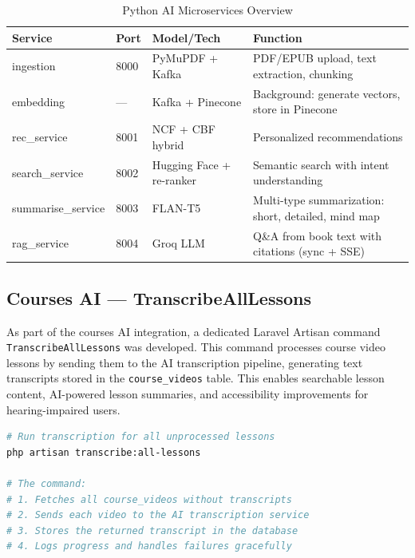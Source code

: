 \begin{table}[H]
\centering
\caption{Python AI Microservices Overview}
\begin{tabularx}{\textwidth}{|l|l|l|X|}
\hline
\textbf{Service} & \textbf{Port} & \textbf{Model/Tech} & \textbf{Function} \\
\hline
ingestion        & 8000 & PyMuPDF + Kafka          & PDF/EPUB upload, text extraction, chunking \\
\hline
embedding        & ---  & Kafka + Pinecone         & Background: generate vectors, store in Pinecone \\
\hline
rec\_service     & 8001 & NCF + CBF hybrid         & Personalized recommendations \\
\hline
search\_service  & 8002 & Hugging Face + re-ranker & Semantic search with intent understanding \\
\hline
summarise\_service & 8003 & FLAN-T5              & Multi-type summarization: short, detailed, mind map \\
\hline
rag\_service     & 8004 & Groq LLM               & Q\&A from book text with citations (sync + SSE) \\
\hline
\end{tabularx}
\end{table}

\subsection{Courses AI --- TranscribeAllLessons}

As part of the courses AI integration, a dedicated Laravel Artisan command
\texttt{TranscribeAllLessons} was developed. This command processes course video
lessons by sending them to the AI transcription pipeline, generating text
transcripts stored in the \texttt{course\_videos} table. This enables
searchable lesson content, AI-powered lesson summaries, and accessibility
improvements for hearing-impaired users.

\begin{lstlisting}[language=bash, caption=Running the TranscribeAllLessons command]
# Run transcription for all unprocessed lessons
php artisan transcribe:all-lessons

# The command:
# 1. Fetches all course_videos without transcripts
# 2. Sends each video to the AI transcription service
# 3. Stores the returned transcript in the database
# 4. Logs progress and handles failures gracefully
\end{lstlisting}

